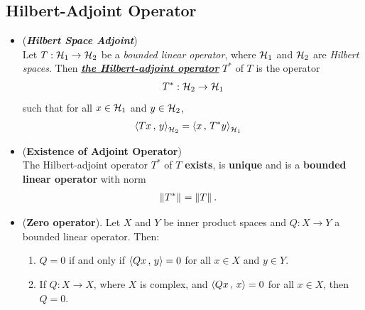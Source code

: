 \documentclass[11pt]{article}
\begin{document}
\subsection{Hilbert-Adjoint Operator}
\begin{itemize}
\item \begin{definition} (\emph{\textbf{Hilbert Space Adjoint}})\\
Let $T: {\mathcal H}_{1} \rightarrow {\mathcal H}_{2}$ be a \emph{bounded linear operator}, where ${\mathcal H}_1$ and ${\mathcal H}_2$ are \emph{Hilbert spaces}. Then \underline{\emph{\textbf{the Hilbert-adjoint operator}}} $T^{*}$ of $T$ is the operator
\begin{align*}
T^{*}: {\mathcal H}_2 \rightarrow {\mathcal H}_1
\end{align*} such that for all $x \in {\mathcal H}_1$ and $y \in {\mathcal H}_2$,
\begin{align}
\left\langle Tx\,,\, y \right\rangle_{{\mathcal H}_2} &= \left\langle x\,,\, T^{*}y \right\rangle_{{\mathcal H}_1} \label{eqn: hilbert_space_adjoint}
\end{align}
\end{definition}


\item \begin{proposition} (\textbf{Existence of Adjoint Operator}) \citep{kreyszig1989introductory}\\
The Hilbert-adjoint operator $T^{*}$ of $T$ \textbf{exists}, is \textbf{unique} and is a \textbf{bounded linear operator} with norm
\begin{align*}
\left\|T^{*}\right\|_{} &= \left\|T\right\|_{}.
\end{align*}
\end{proposition}

\item \begin{lemma}  (\textbf{Zero operator}). \citep{kreyszig1989introductory}
Let $X$ and $Y$ be inner product spaces and $Q: X \rightarrow Y$ a bounded linear operator. Then:
\begin{enumerate}
\item $Q = 0$ if and only if $\left\langle Qx\,,\, y \right\rangle = 0$ for all $x \in X$ and $y \in Y$.
\item If $Q: X \rightarrow X$, where $X$ is complex, and $\left\langle Qx\,,\, x \right\rangle= 0$ for all $x \in X$, then $Q=0$.
\end{enumerate}
\end{lemma}


\end{itemize}
\end{document}
